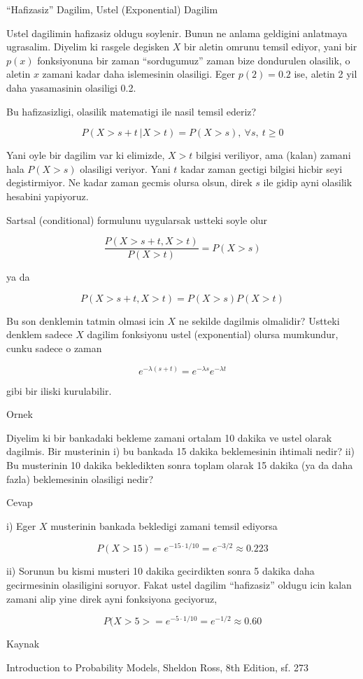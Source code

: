 \documentclass[12pt,fleqn]{article}\usepackage{../common}
\begin{document}
``Hafizasiz'' Dagilim, Ustel (Exponential) Dagilim

Ustel dagilimin hafizasiz oldugu soylenir. Bunun ne anlama geldigini
anlatmaya ugrasalim. Diyelim ki rasgele degisken $X$ bir aletin omrunu
temsil ediyor, yani bir $p(x)$ fonksiyonuna bir zaman ``sordugumuz'' zaman
bize dondurulen olasilik, o aletin $x$ zamani kadar daha islemesinin
olasiligi. Eger $p(2) = 0.2$ ise, aletin 2 yil daha yasamasinin olasiligi
0.2. 

Bu hafizasizligi, olasilik matematigi ile nasil temsil ederiz?

\[ P( X>s+t \ | X>t ) =  P(X>s) , \ \forall s, \ t \ge 0 \]

Yani oyle bir dagilim var ki elimizde, $X>t$ bilgisi veriliyor, ama (kalan)
zamani hala $P(X>s)$ olasiligi veriyor. Yani $t$ kadar zaman gectigi 
bilgisi hicbir seyi degistirmiyor. Ne kadar zaman gecmis olursa olsun,
direk $s$ ile gidip ayni olasilik hesabini yapiyoruz. 

Sartsal (conditional) formulunu uygularsak ustteki soyle olur

\[  \frac{P( X>s+t,  X>t )}{P(X>t)} = P(X>s)  \]

ya da

\[  P( X>s+t,  X>t ) = P(X>s)P(X>t) \]

Bu son denklemin tatmin olmasi icin $X$ ne sekilde dagilmis olmalidir?
Ustteki denklem sadece $X$ dagilim fonksiyonu ustel (exponential) olursa
mumkundur, cunku sadece o zaman

\[ e^{-\lambda(s+t)}  = e^{-\lambda s} e^{-\lambda t}\]

gibi bir iliski kurulabilir. 

Ornek

Diyelim ki bir bankadaki bekleme zamani ortalam 10 dakika ve ustel olarak
dagilmis. Bir musterinin i) bu bankada 15 dakika beklemesinin ihtimali
nedir? ii) Bu musterinin 10 dakika bekledikten sonra toplam olarak 15
dakika (ya da daha fazla) beklemesinin olasiligi nedir? 

Cevap

i) Eger $X$ musterinin bankada bekledigi zamani temsil ediyorsa

\[ P(X>15) = e^{-15 \cdot 1/10} = e^{-3/2} \approx 0.223 \]

ii) Sorunun bu kismi musteri 10 dakika gecirdikten sonra 5 dakika daha
gecirmesinin olasiligini soruyor. Fakat ustel dagilim ``hafizasiz'' oldugu
icin kalan zamani alip yine direk ayni fonksiyona geciyoruz, 

\[ P(X>5> = e^{-5 \cdot 1/10} = e^{-1/2} \approx 0.60\]

Kaynak

Introduction to Probability Models, Sheldon Ross, 8th Edition, sf. 273
\end{document}
